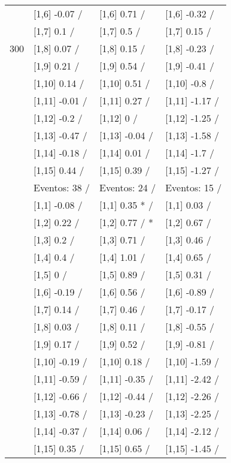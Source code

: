 \begin{table}
\begin{tabular}[t]{llll}
 & {}[1,6] -0.07  / & {}[1,6] 0.71  / & {}[1,6] -0.32  /\\
 & {}[1,7] 0.1  / & {}[1,7] 0.5  / & {}[1,7] 0.15  /\\
300 & {}[1,8] 0.07  / & {}[1,8] 0.15  / & {}[1,8] -0.23  /\\
\addlinespace
 & {}[1,9] 0.21  / & {}[1,9] 0.54  / & {}[1,9] -0.41  /\\
 & {}[1,10] 0.14  / & {}[1,10] 0.51  / & {}[1,10] -0.8  /\\
 & {}[1,11] -0.01  / & {}[1,11] 0.27  / & {}[1,11] -1.17  /\\
 & {}[1,12] -0.2  / & {}[1,12] 0  / & {}[1,12] -1.25  /\\
 & {}[1,13] -0.47  / & {}[1,13] -0.04  / & {}[1,13] -1.58  /\\
\addlinespace
 & {}[1,14] -0.18  / & {}[1,14] 0.01  / & {}[1,14] -1.7  /\\
 & {}[1,15] 0.44  / & {}[1,15] 0.39  / & {}[1,15] -1.27  /\\
 & Eventos:  38 / & Eventos:  24 / & Eventos:  15 /\\
 & {}[1,1] -0.08  / & {}[1,1] 0.35 * / & {}[1,1] 0.03  /\\
 & {}[1,2] 0.22  / & {}[1,2] 0.77  / * & {}[1,2] 0.67  /\\
\addlinespace
 & {}[1,3] 0.2  / & {}[1,3] 0.71  / & {}[1,3] 0.46  /\\
 & {}[1,4] 0.4  / & {}[1,4] 1.01  / & {}[1,4] 0.65  /\\
 & {}[1,5] 0  / & {}[1,5] 0.89  / & {}[1,5] 0.31  /\\
 & {}[1,6] -0.19  / & {}[1,6] 0.56  / & {}[1,6] -0.89  /\\
 & {}[1,7] 0.14  / & {}[1,7] 0.46  / & {}[1,7] -0.17  /\\
\addlinespace
500 & {}[1,8] 0.03  / & {}[1,8] 0.11  / & {}[1,8] -0.55  /\\
 & {}[1,9] 0.17  / & {}[1,9] 0.52  / & {}[1,9] -0.81  /\\
 & {}[1,10] -0.19  / & {}[1,10] 0.18  / & {}[1,10] -1.59  /\\
 & {}[1,11] -0.59  / & {}[1,11] -0.35  / & {}[1,11] -2.42  /\\
 & {}[1,12] -0.66  / & {}[1,12] -0.44  / & {}[1,12] -2.26  /\\
\addlinespace
 & {}[1,13] -0.78  / & {}[1,13] -0.23  / & {}[1,13] -2.25  /\\
 & {}[1,14] -0.37  / & {}[1,14] 0.06  / & {}[1,14] -2.12  /\\
 & {}[1,15] 0.35  / & {}[1,15] 0.65  / & {}[1,15] -1.45  /\\
\bottomrule
\end{tabular}
\end{table}
